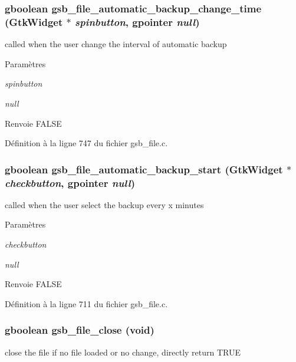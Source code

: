 \subsubsection[{gsb\_\-file\_\-automatic\_\-backup\_\-change\_\-time}]{\setlength{\rightskip}{0pt plus 5cm}gboolean gsb\_\-file\_\-automatic\_\-backup\_\-change\_\-time (GtkWidget $\ast$ {\em spinbutton}, \/  gpointer {\em null})}\label{gsb__file_8h_acad35e7f7cc1f9be4d8de4a0c391e25d}
called when the user change the interval of automatic backup


\begin{DoxyParams}{Paramètres}
\item[{\em spinbutton}]\item[{\em null}]\end{DoxyParams}
\begin{DoxyReturn}{Renvoie}
FALSE 
\end{DoxyReturn}


Définition à la ligne 747 du fichier gsb\_\-file.c.

\subsubsection[{gsb\_\-file\_\-automatic\_\-backup\_\-start}]{\setlength{\rightskip}{0pt plus 5cm}gboolean gsb\_\-file\_\-automatic\_\-backup\_\-start (GtkWidget $\ast$ {\em checkbutton}, \/  gpointer {\em null})}\label{gsb__file_8h_a9e956c0079c7eba15147e2ae85c76442}
called when the user select the backup every x minutes


\begin{DoxyParams}{Paramètres}
\item[{\em checkbutton}]\item[{\em null}]\end{DoxyParams}
\begin{DoxyReturn}{Renvoie}
FALSE 
\end{DoxyReturn}


Définition à la ligne 711 du fichier gsb\_\-file.c.

\subsubsection[{gsb\_\-file\_\-close}]{\setlength{\rightskip}{0pt plus 5cm}gboolean gsb\_\-file\_\-close (void)}\label{gsb__file_8h_a74157bdabf438bfbda5a6040a5c1cc15}
close the file if no file loaded or no change, directly return TRUE


